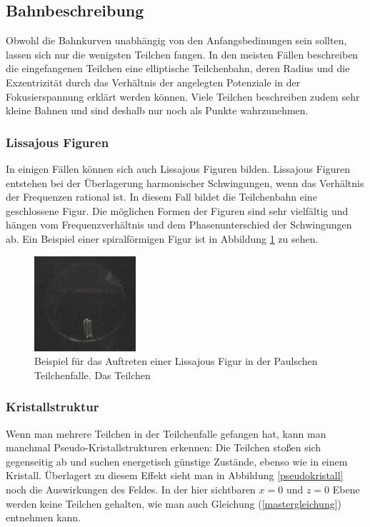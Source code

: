 \documentclass[a4paper,12pt]{article}
\begin{document}
\subsection{Bahnbeschreibung}
Obwohl die Bahnkurven unabhängig von den Anfangsbedinungen sein sollten, lassen sich nur die wenigsten Teilchen fangen.
In den meisten Fällen beschreiben die eingefangenen Teilchen eine elliptische Teilchenbahn, deren Radius und die Exzentrizität durch das Verhältnis der angelegten Potenziale 
in der Fokusierspannung erklärt werden können.
Viele Teilchen beschreiben zudem sehr kleine Bahnen und sind deshalb nur noch als Punkte wahrzunehmen.

\subsubsection*{Lissajous Figuren}
In einigen Fällen können sich auch Lissajous Figuren bilden. Lissajous Figuren entstehen bei der Überlagerung harmonischer Schwingungen, wenn das Verhältnis der Frequenzen rational ist.
In diesem Fall bildet die Teilchenbahn eine geschlossene Figur.
Die möglichen Formen der Figuren sind sehr vielfältig und hängen vom Frequenzverhältnis und dem Phasenunterschied der Schwingungen ab.
Ein Beispiel einer spiralförmigen Figur ist in Abbildung \ref{Lissjous} zu sehen.

\begin{figure}[htb]
		\centering
		\includegraphics{lisa_klein.jpg}
		\caption{Beispiel für das Auftreten einer Lissajous Figur in der Paulschen Teilchenfalle.
		Das Teilchen }
		\label{Lissjous}
\end{figure}

\subsubsection*{Kristallstruktur}
Wenn man mehrere Teilchen in der Teilchenfalle gefangen hat, kann man manchmal Pseudo-Kristallstrukturen erkennen:
Die Teilchen stoßen sich gegenseitig ab und suchen energetisch günstige Zustände, ebenso wie in einem Kristall.
Überlagert zu diesem Effekt sieht man in Abbildung \ref{pseudokristall} noch die Auswirkungen des Feldes.
In der hier sichtbaren $x = 0$ und $z = 0$  Ebene werden keine Teilchen gehalten, wie man auch Gleichung (\ref{mastergleichung}) entnehmen kann.
\end{document}

